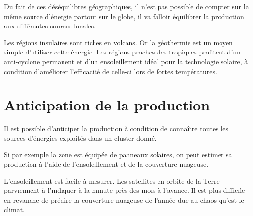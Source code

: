 Du fait de ces déséquilibres géographiques, il n'est pas possible de compter sur la même source d'énergie partout
sur le globe, il va falloir équilibrer la production aux différentes sources locales.

Les régions insulaires sont riches en volcans. Or la géothermie est un moyen simple d'utiliser cette énergie.
Les régions proches des tropiques profitent d'un anti-cyclone permanent et d'un ensoleillement
idéal pour la technologie solaire, à condition d'améliorer l'efficacité de celle-ci lors de fortes températures.

\section{Anticipation de la production}

Il est possible d'anticiper la production à condition de connaître toutes les sources d'énergies
exploités dans un cluster donné.

Si par exemple la zone est équipée de panneaux solaires, on peut estimer sa production à l'aide de
l'ensoleillement et de la couverture nuageuse.

L'ensoleillement est facile à mesurer. Les satellites en orbite de la Terre parviennent à l'indiquer à la minute près
des mois à l'avance.
Il est plus difficile en revanche de prédire la couverture nuageuse de l'année due au chaos qu'est le climat.
